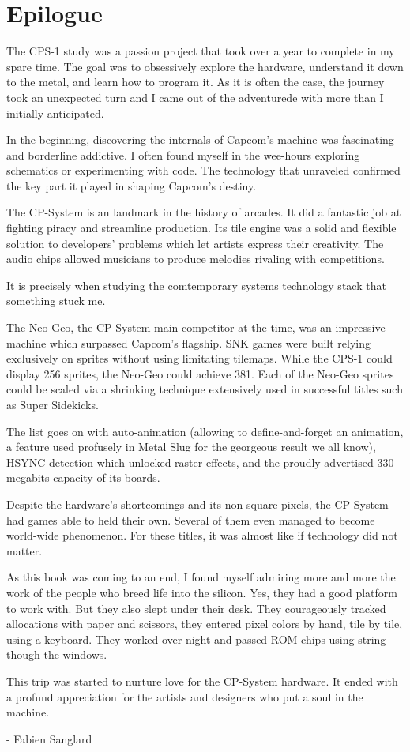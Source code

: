 \chapter{Epilogue} 

The CPS-1 study was a passion project that took over a year to complete in my spare time. The goal was to obsessively explore the hardware, understand it down to the metal, and learn how to program it. As it is often the case, the journey took an unexpected turn and I came out of the adventurede with more than I initially anticipated.

In the beginning, discovering the internals of Capcom's machine was fascinating and borderline addictive. I often found myself in the wee-hours exploring schematics or experimenting with code. The technology that unraveled confirmed the key part it played in shaping Capcom's destiny. 

The CP-System is an landmark in the history of arcades. It did a fantastic job at fighting piracy and streamline production. Its tile engine was a solid and flexible solution to developers' problems which let artists express their creativity. The audio chips allowed musicians to produce melodies rivaling with competitions.

It is precisely when studying the comtemporary systems technology stack that something stuck me. 

The Neo-Geo, the CP-System main competitor at the time, was an impressive machine which surpassed Capcom's flagship. SNK games were built relying exclusively on sprites without using limitating tilemaps. While the CPS-1 could display 256 sprites, the Neo-Geo could achieve 381. Each of the Neo-Geo sprites could be scaled via a shrinking technique extensively used in successful titles such as Super Sidekicks. 

The list goes on with auto-animation (allowing to define-and-forget an animation, a feature used profusely in Metal Slug for the georgeous result we all know), HSYNC detection which unlocked raster effects, and the proudly advertised 330 megabits capacity of its boards.

Despite the hardware's shortcomings and its non-square pixels, the CP-System had games able to held their own. Several of them even managed to become world-wide phenomenon. For these titles, it was almost like if technology did not matter.

As this book was coming to an end, I found myself admiring more and more the work of the people who breed life into the silicon. Yes, they had a good platform to work with. But they also slept under their desk. They courageously tracked allocations with paper and scissors, they entered pixel colors by hand, tile by tile, using a keyboard. They worked over night and passed ROM chips using string though the windows. 

This trip was started to nurture love for the CP-System hardware. It ended with a profund appreciation for the artists and designers who put a soul in the machine.

- Fabien Sanglard
